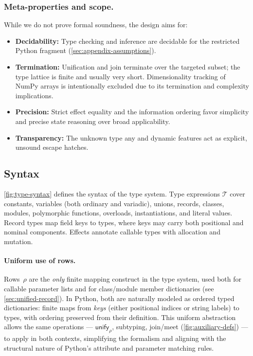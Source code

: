\subsubsection*{Meta-properties and scope.}
While we do not prove formal soundness, the design aims for:
\begin{itemize}
  \item \textbf{Decidability:} Type checking and inference are decidable for the restricted Python fragment (\autoref{sec:appendix-assumptions}).
  \item \textbf{Termination:} Unification and join terminate over the targeted subset; the type lattice is finite and usually very short. Dimensionality tracking of NumPy arrays is intentionally excluded due to its termination and complexity implications.
  \item \textbf{Precision:} Strict effect equality and the information ordering favor simplicity and precise state reasoning over broad applicability.
  \item \textbf{Transparency:} The unknown type \textsf{any} and dynamic features act as explicit, unsound escape hatches.
\end{itemize}

\subsection{Syntax}
\autoref{fig:type-syntax} defines the syntax of the type system. Type expressions $\mathcal{T}$ cover constants, variables (both ordinary and variadic), unions, records, classes, modules, polymorphic functions, overloads, instantiations, and literal values.  
Record types map field keys to types, where keys may carry both positional and nominal components.  
Effects annotate callable types with allocation and mutation.

\paragraph{Uniform use of rows.}
Rows~$\rho$ are the \emph{only} finite mapping construct in the type system, used both for
callable parameter lists and for class/module member dictionaries (see \autoref{sec:unified-record}).  
In Python, both are naturally modeled as ordered typed dictionaries: finite maps from
\emph{keys} (either positional indices or string labels) to types, with ordering
preserved from their definition.  
This uniform abstraction allows the same operations --- $\mathsf{unify}_{\rho}$, subtyping, join/meet (\autoref{fig:auxiliary-defs}) --- to apply in both contexts,  
simplifying the formalism and aligning with the structural nature of Python's
attribute and parameter matching rules.

